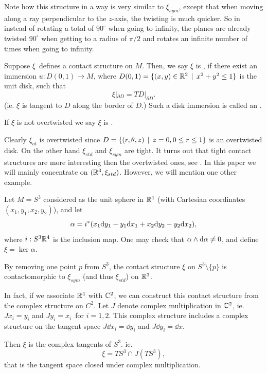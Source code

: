 Note how this structure in a way is very similar to $\xi_{sym}$, except that
when moving along a ray perpendicular to the $z$-axis, the twisting is much
quicker. So in instead of rotating a total of $90^\circ$ when going to infinity,
the planes are already twisted $90^\circ$ when getting to a radius of $\pi/2$ and
rotates an infinite number of times when going to infinity.

\begin{defn}
Suppose $\xi$ defines a contact structure on $M$. Then, we say $\xi$ is
, if there exist an immersion $u : D(0,1) \to M$, where
$D(0,1) = \{ (x,y) \in \mathbb{R}^2 \:\:|\:\: x^2+y^2 \le 1 \}$ is the unit disk, such that
\[ \xi|_{\partial D} = TD|_{\partial D}. \]
(ie. $\xi$ is tangent to $D$ along the border of $D$.) Such a disk immersion is
called an .

If $\xi$ is not overtwisted we say $\xi$ is .
\end{defn}

Clearly $\xi_{ot}$ is overtwisted since $D = \{ (r,\theta, z) \:\:|\:\: z = 0, 0 \le
r \le 1\}$ is an overtwisted disk. On the other hand $\xi_{std}$ and $\xi_{sym}$
are tight. It turns out that tight contact structures are more interesting then
the overtwisted ones, see \cite{Eliashberg1989}. In this paper we will mainly
concentrate on $(\mathbb{R}^3, \xi_{std})$. However, we will mention one other example.   

\begin{exmp}
Let $M=S^3$ considered as the unit sphere in $\mathbb{R}^4$ (with Cartesian coordinates
$(x_1,y_1,x_2,y_2)$), and let 
\[ \alpha = i^*( x_1 \mathrm{d} y_1 - y_1 \mathrm{d} x_1 + x_2 \mathrm{d} y_2 - y_2 \mathrm{d} x_2 ), \]
where $i: S^3 \mathbb{R}^4$ is the inclusion map. One may check that $\alpha \wedge \mathrm{d}
\alpha \ne 0$, and define $\xi = \ker \alpha$.
\end{exmp}

By removing one point $p$ from $S^3$, the contact structure $\xi$ on $S^3 \setminus
\{p\}$ is
contactomorphic to $\xi_{sym}$ (and thus $\xi_{std}$) on $\mathbb{R}^3$. 

In fact, if we associate $\mathbb{R}^4$ with $\mathbb{C}^2$, we can construct this contact
structure from the complex structure on $C^2$. Let $J$ denote complex
multiplication in $\mathbb{C}^2$, ie. $J x_i = y_i$ and $J y_i = x_i$ for $i=1,2$. This
complex structure includes a complex structure on the tangent space $J
\dd{x_i} = \dd{y_i}$ and $J\dd{y_i} = \dd{x}$.

\begin{clame}
Then $\xi$ is the complex tangents of $S^3$. ie.
\[  \xi = TS^3 \cap J (TS^3), \]
that is the tangent space closed under complex multiplication. 
\end{clame}

